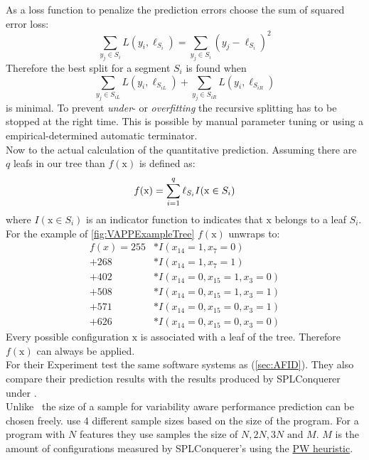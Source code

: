 As a loss function to penalize the prediction errors \citet{VariabilityAwarePerformancePredictionJianmeiSigmundApel} choose the sum of squared error loss:
\begin{equation}
	\sum_{y_j \in S_i} L(y_i,\ell_{S_i}) = \sum_{y_j \in S_i} (y_j - \ell_{S_i})^2
\end{equation}
Therefore the best split for a segment $S_i$ is found when
\begin{equation*}
\sum_{y_j \in S_{iL}} L(y_i,\ell_{S_{iL}}) + \sum_{y_j \in S_{iR}} L(y_i,\ell_{S_{iR}})
\end{equation*}
is minimal. To prevent \textit{under}- or \textit{overfitting}\cite{ElementsOfStatisticalLearning} the recursive splitting has to be stopped at the right time. This is possible by manual parameter tuning or using a empirical-determined automatic terminator. \\
Now to the actual calculation of the quantitative prediction. Assuming there are $q$ leafs in our tree than $f(\mathrm{x})$ is defined as:
\begin{equation}\textsl{}
f(\mathrm{x})=\sum_{i=1}^{q} \ell_{S_i}I(\mathrm{x}\in S_i)
\end{equation}
where $I(\mathrm{x}\in S_i)$ is an indicator function to indicates that $\mathrm{x}$ belongs to a leaf $S_i$.\\
For the example of \autoref{fig:VAPPExampleTree} $f(\mathrm{x})$ unwraps to:
\begin{align*}
f(x) = 255&* I(x_{14}=1,x_7=0)\\[-0.1cm]
	 + 268&* I(x_{14}=1,x_7=1)\\[-0.1cm]
	 + 402&* I(x_{14}=0,x_{15}=1,x_3=0)\\[-0.1cm]
	 + 508&* I(x_{14}=0,x_{15}=1,x_3=1)\\[-0.1cm]
	 + 571&* I(x_{14}=0,x_{15}=0,x_3=1)\\[-0.1cm]
	 + 626&* I(x_{14}=0,x_{15}=0,x_3=0)
\end{align*}
Every possible configuration $\mathrm{x}$ is associated with a leaf of the tree. Therefore $f(\mathrm{x})$ can always be applied.\\
For their Experiment \citet{VariabilityAwarePerformancePredictionJianmeiSigmundApel} test the same software systems as \citet{AutomatedFeatureDetectionSiegmund2012} (\cref{sec:AFID}). They also compare their prediction results with the results produced by SPLConquerer under \AFID.\\
Unlike \AFID~the size of a sample for variability aware performance prediction can be chosen freely. \citet{VariabilityAwarePerformancePredictionJianmeiSigmundApel} use 4 different sample sizes based on the size of the program. For a program with $N$ features they use samples the size of $N,2N,3N \text{ and } M$. $M$ is the amount of configurations measured by SPLConquerer's using the \hyperref[lab:PW]{PW heuristic}.
